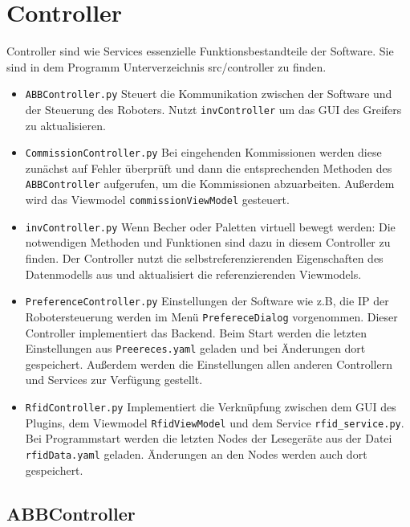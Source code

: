\section{Controller}
Controller sind wie Services essenzielle Funktionsbestandteile der Software. Sie sind in dem Programm Unterverzeichnis \glqq src/controller \grqq zu finden. 
\begin{itemize}
    \item \verb|ABBController.py| Steuert die Kommunikation zwischen der Software und der Steuerung des Roboters. Nutzt \verb|invController| um das GUI des Greifers zu aktualisieren.
    \item \verb|CommissionController.py| Bei eingehenden Kommissionen werden diese zunächst auf Fehler überprüft und dann die entsprechenden Methoden des \verb|ABBController| aufgerufen, um die Kommissionen abzuarbeiten. Außerdem wird das Viewmodel \verb|commissionViewModel| gesteuert. 
    \item \verb|invController.py| Wenn Becher oder Paletten virtuell bewegt werden: Die notwendigen Methoden und Funktionen sind dazu in diesem Controller zu finden. Der Controller nutzt die selbstreferenzierenden Eigenschaften des Datenmodells aus und aktualisiert die referenzierenden Viewmodels.
    \item \verb|PreferenceController.py| Einstellungen der Software wie z.B, die IP der Robotersteuerung werden im Menü \verb|PrefereceDialog| vorgenommen. Dieser Controller implementiert das Backend. Beim Start werden die letzten Einstellungen aus \verb|Preereces.yaml| geladen und bei Änderungen dort gespeichert. Außerdem werden die Einstellungen allen anderen Controllern und Services zur Verfügung gestellt.
    \item \verb|RfidController.py| Implementiert die Verknüpfung zwischen dem GUI des Plugins, dem Viewmodel \verb|RfidViewModel| und dem Service \verb|rfid_service.py|. Bei Programmstart werden die letzten Nodes der Lesegeräte aus der Datei \verb|rfidData.yaml| geladen. Änderungen an den Nodes werden auch dort gespeichert. 
\end{itemize}
\subsection{ABBController}

